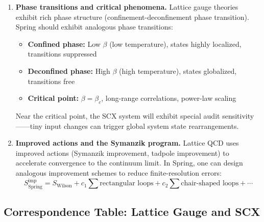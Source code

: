 \documentclass[12pt,a4paper]{article}
\theoremstyle{remark}
\begin{document}
\begin{enumerate}[label=\textbf{(L\arabic*)}]
    \item \textbf{Phase transitions and critical phenomena.} Lattice gauge theories exhibit rich phase structure
    (confinement-deconfinement phase transition). Spring should exhibit analogous phase transitions:
    \begin{itemize}
        \item \textbf{Confined phase:} Low $\beta$ (low temperature), states highly localized, transitions suppressed
        \item \textbf{Deconfined phase:} High $\beta$ (high temperature), states globalized, transitions free
        \item \textbf{Critical point:} $\beta = \beta_c$, long-range correlations, power-law scaling
    \end{itemize}
    Near the critical point, the SCX system will exhibit special audit sensitivity——tiny input changes
    can trigger global system state rearrangements.

    \item \textbf{Improved actions and the Symanzik program.} Lattice QCD uses improved actions
    (Symanzik improvement, tadpole improvement) to accelerate convergence to the continuum limit.
    In Spring, one can design analogous improvement schemes to reduce finite-resolution errors:
    \begin{equation}
        S_{\text{Spring}}^{\text{imp}} = S_{\text{Wilson}} +
        c_1 \sum \text{rectangular loops} + c_2 \sum \text{chair-shaped loops} + \cdots
    \end{equation}
\end{enumerate}

\subsection{Correspondence Table: Lattice Gauge and SCX}
\end{document}

